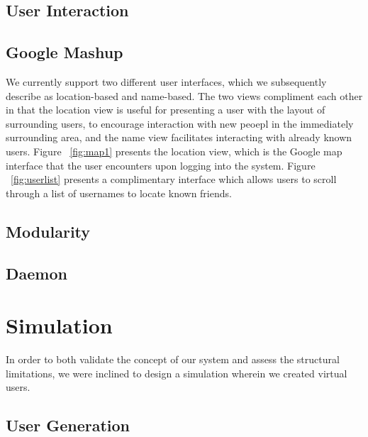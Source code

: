 \documentclass[11pt]{article}
\begin{document}

\subsection{User Interaction}


\subsection{Google Mashup}

We currently support two different user interfaces, which we subsequently describe as location-based and name-based. The two views compliment each other in that the location view is useful for presenting a user with the layout of surrounding users, to encourage interaction with new peoepl in the immediately surrounding area, and the name view facilitates interacting with already known users. Figure ~\ref{fig:map1} presents the location view, which is the Google map interface that the user encounters upon logging into the system. 
Figure ~\ref{fig:userlist} presents a complimentary interface which allows users to scroll through a list of usernames to locate known friends.

\subsection{Modularity}



\subsection{Daemon}


\section{Simulation}


In order to both validate the concept of our system and assess the structural limitations, we were inclined to design a simulation wherein we created virtual users.

\subsection{User Generation}
\end{document}
